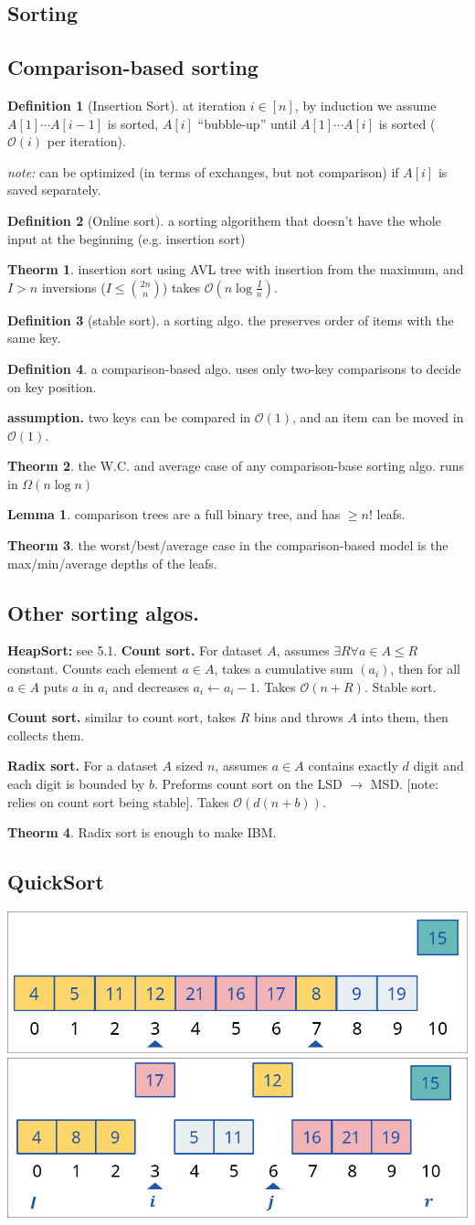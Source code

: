 \documentclass[]{article}
\newcommand\compactsubsection[1]        {\vspace{-10pt}\subsection{#1}\vspace{-5pt}}
\newcommand\compactsection   [1]        {\vspace{-10pt}\section{#1}\vspace{-5pt}}
\newcommand\subsectionrightaftersection {\vspace{10pt}}
\theoremstyle{definition}
\newtheorem{Theorem}{\color{theoColor}Theorm}
\newtheorem{Definition}{\color{defiColor}Definition}
\newtheorem{Lemma}{\color{lemColor}Lemma}
\newcommand\theo  [1] {\begin{Theorem}#1\end{Theorem}}
\newcommand\defi  [1] {\begin{Definition}#1\end{Definition}}
\newcommand\lem   [1] {\begin{Lemma}#1\end{Lemma}}
\newcommand\oc    {\mathcal{O}}
\newcommand\logn      {\log n}
\newcommand\cl [1]    {\left ( #1 \right )}
\begin{document}
\begin{multicols}{4}
		\compactsection{Sorting}\subsectionrightaftersection
			\compactsubsection{Comparison-based sorting}
				\begin{Definition}[Insertion Sort]
					at iteration $i \in [n]$, by induction we assume $A[1] \cdots A[i - 1]$ is sorted, $A[i]$ ``bubble-up'' until $A[1] \cdots A[i]$ is sorted ($\oc(i)$ per iteration). 
				\end{Definition}
				\textit{note: }can be optimized (in terms of exchanges, but not comparison) if $A[i]$ is saved separately. 
				\begin{Definition}[Online sort]a sorting algorithem that doesn't have the whole input at the beginning (e.g. insertion sort)
				\end{Definition}
				\theo{insertion sort using AVL tree with insertion from the maximum, and $I > n$ inversions ($I \le \binom{2n}{n}$) takes $\oc\cl{n \log \frac{I}{n}}$. }
				\begin{Definition}[stable sort]
					 a sorting algo. the preserves order of items with the same key. 
				\end{Definition}
				\defi{a comparison-based algo. uses only two-key comparisons to decide on key position. }
				\textbf{assumption. }two keys can be compared in $\oc(1)$, and an item can be moved in $\oc(1)$. 
				\theo{the W.C. and average case of any comparison-base sorting algo. runs in $\Omega(n \logn)$}
				\lem{comparison trees are a full binary tree, and has $\ge n!$ leafs. }
				\theo{the worst/best/average case in the comparison-based model is the max/min/average depths of the leafs. }
			\compactsubsection{Other sorting algos. }
				\textbf{HeapSort: }see 5.1. 
				\textbf{Count sort. }For dataset $A$, assumes $\exists R \forall a \in A \le R$ constant. Counts each element $a \in A$, takes a cumulative sum $(a_i)$, then for all $a \in A$ puts $a$ in $a_i$ and decreases $a_i \gets a_i - 1$. Takes $\oc(n + R)$. Stable sort. 
				
				\textbf{Count sort. }similar to count sort, takes $R$ bins and throws $A$ into them, then collects them. 
				
				\textbf{Radix sort. }For a dataset $A$ sized $n$, assumes $a \in A$ contains exactly $d$ digit and each digit is bounded by $b$. Preforms count sort on the LSD $\to$ MSD. [note: relies on count sort being stable]. Takes $\oc(d(n + b))$. 
				
				\theo{Radix sort is enough to make IBM. }
				
			\compactsubsection{QuickSort}
				\begin{center}
					\includegraphics[width=0.51\linewidth]{images/lomuto}
					\includegraphics[width=0.45\linewidth]{images/horse}
				\end{center}


\end{multicols}
\end{document}
